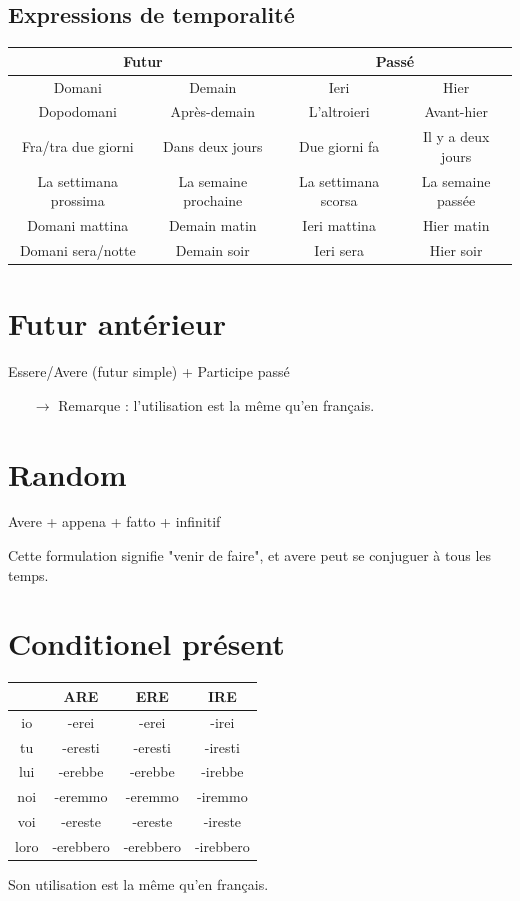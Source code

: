 \documentclass[12pt, openany]{report}
\begin{document}
\subsection{Expressions de temporalité}
\begin{center}
    \begin{tabular}{c|c|c|c}
        \multicolumn{2}{c|}{\textbf{Futur}} & \multicolumn{2}{c}{\textbf{Passé}} \\ \hline
        Domani & Demain & Ieri & Hier \\
        Dopodomani & Après-demain & L'altroieri & Avant-hier \\
        Fra/tra due giorni & Dans deux jours & Due giorni fa & Il y a deux jours \\
        La settimana prossima & La semaine prochaine & La settimana scorsa & La semaine passée \\
        Domani mattina & Demain matin & Ieri mattina & Hier matin \\
        Domani sera/notte & Demain soir & Ieri sera & Hier soir \\
    \end{tabular}
\end{center}
\section{Futur antérieur}
\begin{center}
    Essere/Avere (futur simple) + Participe passé 
\end{center}
\begin{itemize}
    \item [$\to$] Remarque : l'utilisation est la même qu'en français.
\end{itemize}
\section{Random}
\begin{center}
    Avere + appena + fatto + infinitif 
\end{center}
Cette formulation signifie "venir de faire", et avere peut se conjuguer à tous les temps.
\section{Conditionel présent}
\begin{center}
    \begin{tabular}{c|c|c|c}
        & ARE & ERE & IRE\\ \hline
        io & -erei & -erei & -irei\\
        tu & -eresti & -eresti & -iresti\\
        lui & -erebbe & -erebbe & -irebbe\\
        noi & -eremmo & -eremmo & -iremmo\\
        voi & -ereste & -ereste & -ireste\\
        loro & -erebbero & -erebbero & -irebbero\\
    \end{tabular}
\end{center} 
Son utilisation est la même qu'en français. 
\end{document}

